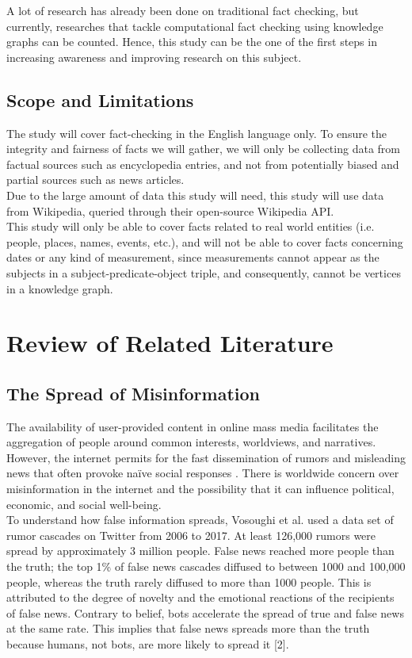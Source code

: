 \documentclass[10pt,11pt,12pt,oneside]{book}
\begin{document}
		A lot of research has already been done on traditional fact checking, but currently, researches that tackle computational fact checking using knowledge graphs can be counted. Hence, this study can be the one of the first steps in increasing awareness and improving research on this subject.\\
	
	\section{Scope and Limitations}
		The study will cover fact-checking in the English language only. To ensure the integrity and fairness of facts we will gather, we will only be collecting data from factual sources such as encyclopedia entries, and not from potentially biased and partial sources such as news articles.\\
		
		Due to the large amount of data this study will need, this study will use data from Wikipedia, queried through their open-source Wikipedia API.\\
		
		This study will only be able to cover facts related to real world entities (i.e. people, places, names, events, etc.), and will not be able to cover facts concerning dates or any kind of measurement, since measurements cannot appear as the subjects in a subject-predicate-object triple, and consequently, cannot be vertices in a knowledge graph.\\

\chapter{Review of Related Literature}
	\section{The Spread of Misinformation}
	The availability of user-provided content in online mass media facilitates the aggregation of people around common interests, worldviews, and narratives. However, the internet permits for the fast dissemination of rumors and misleading news that often provoke naïve social responses \cite{DelVicario_2016}. There is worldwide concern over misinformation in the internet and the possibility that it can influence political, economic, and social well-being.\\[8pt]
	
	To understand how false information spreads, Vosoughi et al. used a data set of rumor cascades on Twitter from 2006 to 2017. At least 126,000 rumors were spread by approximately 3 million people. False news reached more people than the truth; the top 1\% of false news cascades diffused to between 1000 and 100,000 people, whereas the truth rarely diffused to more than 1000 people. This is attributed to the degree of novelty and the emotional reactions of the recipients of false news. Contrary to belief, bots accelerate the spread of true and false news at the same rate. This implies that false news spreads more than the truth because humans, not bots, are more likely to spread it [2].
	
\end{document}
